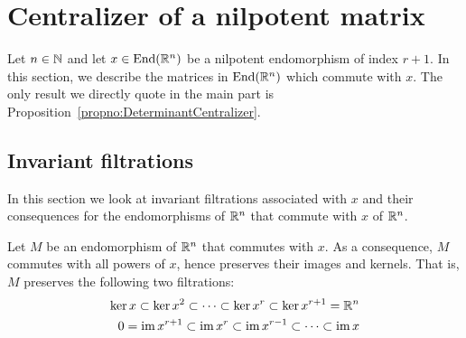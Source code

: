 \documentclass[english]{article}
\begin{document}
\clearpage
\appendix

\section{Centralizer of a nilpotent matrix}
\label{secno:centralizer}

Let $n\in \mathbb{N}$ and let $x\in \operatorname{End}(\mathbb{R}^n)$ be a nilpotent endomorphism of index $r+1$.
In this section, we describe the matrices in $\operatorname{End}(\mathbb{R}^n)$ which commute with $x$.
The only result we directly quote in the main part is Proposition~\ref{propno:DeterminantCentralizer}.

\subsection{Invariant filtrations}\label{secno:InvariantFlag}

In this section we look at invariant filtrations associated with $x$ and their consequences for the endomorphisms of $\mathbb{R}^n$ that commute with $x$ of $\mathbb{R}^n$.

Let $M$ be an endomorphism of $\mathbb{R}^n$ that commutes with $x$. As a consequence, $M$ commutes with all powers of $x$, hence preserves their images and kernels. That is, $M$ preserves the following two filtrations:
\begin{align}
    \ker x \subset \ker x^2 \subset \dots \subset \ker x^r \subset \ker x^{r+1} = \mathbb{R}^n\\
    0 = \operatorname{im} x^{r+1} \subset \operatorname{im} x^r \subset \operatorname{im} x^{r-1} \subset \dots \subset \operatorname{im} x
\end{align}
\end{document}
